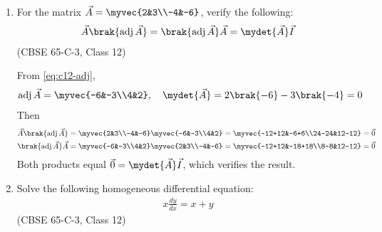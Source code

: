 \begin{enumerate}[label=\thesubsection.\arabic*., ref=\thesubsection.\theenumi]
\begin{center}
\end{center}
 
\setcounter{enumi}{24}
\item For the matrix $\vec{A}=\myvec{2&3\\-4&-6}$, verify the following:
\begin{align*}
\vec{A}\brak{\operatorname{adj}\vec{A}} = \brak{\operatorname{adj}\vec{A}}\vec{A} = \mydet{\vec{A}}\vec{I}
\end{align*}
\hfill (CBSE 65-C-3, Class 12)
 
\solution From \eqref{eq:c12-adj},
\begin{align}
\operatorname{adj}\vec{A} = \myvec{-6&-3\\4&2},\quad
\mydet{\vec{A}} = 2\brak{-6}-3\brak{-4} = 0
\end{align}
Then
\begin{align}
\vec{A}\brak{\operatorname{adj}\vec{A}}
&= \myvec{2&3\\-4&-6}\myvec{-6&-3\\4&2}
= \myvec{-12+12&-6+6\\24-24&12-12} = \vec{0}
\\
\brak{\operatorname{adj}\vec{A}}\vec{A}
&= \myvec{-6&-3\\4&2}\myvec{2&3\\-4&-6}
= \myvec{-12+12&-18+18\\8-8&12-12} = \vec{0}
\end{align}
Both products equal $\vec{0}=\mydet{\vec{A}}\vec{I}$, which verifies the result.
 
\begin{center}
\end{center}
 
\item Solve the following homogeneous differential equation:
\begin{align*}
x\frac{dy}{dx} = x+y
\end{align*}
\hfill (CBSE 65-C-3, Class 12)
 

\end{enumerate}
